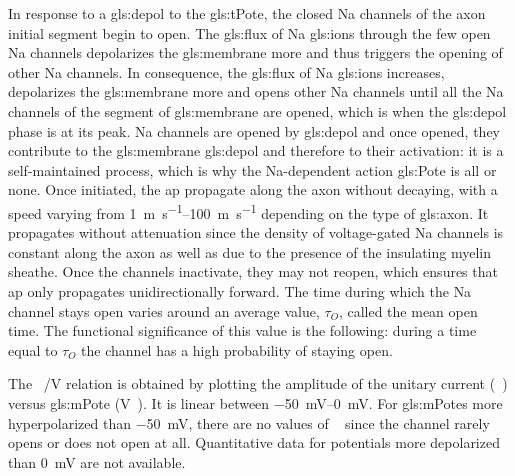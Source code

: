 \documentclass[class={.NoTouch/myProject}, crop=false]{standalone}
\begin{document}
In response to a \gls{gls:depol} to the \gls{gls:tPote}, the closed \gls{Na} channels of the axon initial segment begin to open. The \gls{gls:flux} of \gls{Na} \glspl{gls:ion} through the few open \gls{Na} channels depolarizes the \gls{gls:membrane} more and thus triggers the opening of other \gls{Na} channels. In consequence, the \gls{gls:flux} of \gls{Na} \glspl{gls:ion} increases, depolarizes the \gls{gls:membrane} more and opens other \gls{Na} channels until all the \gls{Na} channels of the segment of \gls{gls:membrane} are opened, which is when the \gls{gls:depol} phase is at its peak. \gls{Na} channels are opened by \gls{gls:depol} and once opened, they contribute to the \gls{gls:membrane} \gls{gls:depol} and therefore to their activation: it is a self-maintained process, which is why the  \gls{Na}-dependent  action  \gls{gls:Pote}  is  all  or  none. Once initiated, the \gls{ap} propagate along the axon without decaying, with a speed varying from \qtyrange{1}{100}{\m\per\s} depending on the type of \gls{gls:axon}.  It  propagates  without  attenuation  since  the  density of voltage-gated \gls{Na} channels is constant along the  axon as well as due to the presence of the insulating myelin sheathe.  Once the channels inactivate, they may not reopen, which ensures that \gls{ap} only propagates  unidirectionally forward. 
The time during which the \gls{Na} channel stays open varies around an average value, \(\tau_O\), called the mean open time. The functional significance of this value is the following: during a time equal to \(\tau_O\) the channel has a high probability of staying open. 

The \unit[per-mode = symbol]{\cur\sodium\per\V} relation is obtained by plotting the amplitude of the unitary current (\unit{\cur\sodium}) versus \gls{gls:mPote} (\unit{\V\membrane}). It is linear between \qtyrange{-50}{0}{\mV}. For \glspl{gls:mPote} more hyperpolarized than \qty{-50}{\mV}, there are no values of \unit{\cur\sodium} since the channel rarely opens or does not open at all. Quantitative data for potentials more depolarized than \qty{0}{\mV} are not available.
\end{document}
